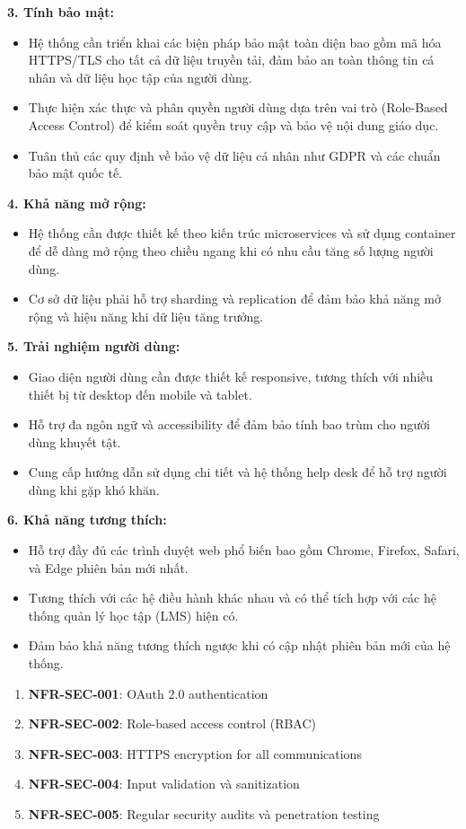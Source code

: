 \textbf{3. Tính bảo mật:}
\begin{itemize}
\item Hệ thống cần triển khai các biện pháp bảo mật toàn diện bao gồm mã hóa HTTPS/TLS cho tất cả dữ liệu truyền tải, đảm bảo an toàn thông tin cá nhân và dữ liệu học tập của người dùng.
\item Thực hiện xác thực và phân quyền người dùng dựa trên vai trò (Role-Based Access Control) để kiểm soát quyền truy cập và bảo vệ nội dung giáo dục.
\item Tuân thủ các quy định về bảo vệ dữ liệu cá nhân như GDPR và các chuẩn bảo mật quốc tế.
\end{itemize}

\textbf{4. Khả năng mở rộng:}
\begin{itemize}
\item Hệ thống cần được thiết kế theo kiến trúc microservices và sử dụng container để dễ dàng mở rộng theo chiều ngang khi có nhu cầu tăng số lượng người dùng.
\item Cơ sở dữ liệu phải hỗ trợ sharding và replication để đảm bảo khả năng mở rộng và hiệu năng khi dữ liệu tăng trưởng.
\end{itemize}

\textbf{5. Trải nghiệm người dùng:}
\begin{itemize}
\item Giao diện người dùng cần được thiết kế responsive, tương thích với nhiều thiết bị từ desktop đến mobile và tablet.
\item Hỗ trợ đa ngôn ngữ và accessibility để đảm bảo tính bao trùm cho người dùng khuyết tật.
\item Cung cấp hướng dẫn sử dụng chi tiết và hệ thống help desk để hỗ trợ người dùng khi gặp khó khăn.
\end{itemize}

\textbf{6. Khả năng tương thích:}
\begin{itemize}
\item Hỗ trợ đầy đủ các trình duyệt web phổ biến bao gồm Chrome, Firefox, Safari, và Edge phiên bản mới nhất.
\item Tương thích với các hệ điều hành khác nhau và có thể tích hợp với các hệ thống quản lý học tập (LMS) hiện có.
\item Đảm bảo khả năng tương thích ngược khi có cập nhật phiên bản mới của hệ thống.
\end{itemize}

\begin{enumerate}
    \item \textbf{NFR-SEC-001}: OAuth 2.0 authentication
    \item \textbf{NFR-SEC-002}: Role-based access control (RBAC)
    \item \textbf{NFR-SEC-003}: HTTPS encryption for all communications
    \item \textbf{NFR-SEC-004}: Input validation và sanitization
    \item \textbf{NFR-SEC-005}: Regular security audits và penetration testing
\end{enumerate}

